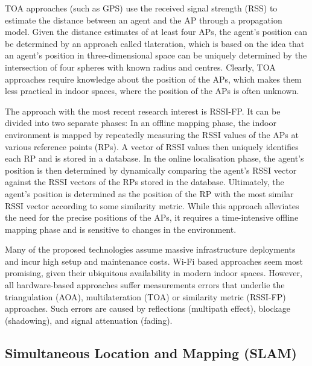 \documentclass[a4paper]{article}
\begin{document}
  TOA approaches (such as GPS) use the received signal strength (RSS) to
  estimate the distance between an agent and the AP through a propagation model.
  Given the distance estimates of at least four APs, the agent's position can be
  determined by an approach called tlateration, which is based on the idea
  that an agent's position in three-dimensional space can be uniquely determined
  by the intersection of four spheres with known radius and centres. Clearly,
  TOA approaches require knowledge about the position of the APs, which makes
  them less practical in indoor spaces, where the position of the APs is often
  unknown.

  The approach with the most recent research interest is RSSI-FP. It can be divided into
  two separate phases: In an offline mapping phase, the indoor environment is
  mapped by repeatedly measuring the RSSI values of the APs at various reference
  points (RPs). A vector of RSSI values then uniquely identifies each RP and is
  stored in a database. In the online localisation phase, the agent's position
  is then determined by dynamically comparing the agent's RSSI vector against
  the RSSI vectors of the RPs stored in the database. Ultimately, the agent's
  position is determined as the position of the RP with the most similar RSSI
  vector according to some similarity metric. While this approach alleviates the
  need for the precise positions of the APs, it requires a time-intensive
  offline mapping phase and is sensitive to changes in the environment.

  Many of the proposed technologies assume massive infrastructure deployments
  and incur high setup and maintenance costs. Wi-Fi based approaches seem most
  promising, given their ubiquitous availability in modern indoor spaces. 
  However, all hardware-based approaches suffer measurements errors that
  underlie the triangulation (AOA), multilateration (TOA) or similarity metric
  (RSSI-FP) approaches. Such errors are caused by reflections (multipath
  effect), blockage (shadowing), and signal attenuation (fading).



  \subsection{Simultaneous Location and Mapping (SLAM)} %
\end{document}

